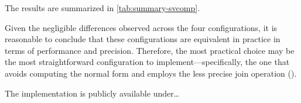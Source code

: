 The results are summarized in \cref{tab:summary-svcomp}.

Given the negligible differences observed across the four configurations, it is reasonable to conclude that these configurations are equivalent in practice in terms of performance and precision.
Therefore, the most practical choice may be the most straightforward configuration to implement---specifically, the one that avoids computing the normal form and employs the less precise join operation (\cpoq).

The implementation is publicly available under\dots {}

